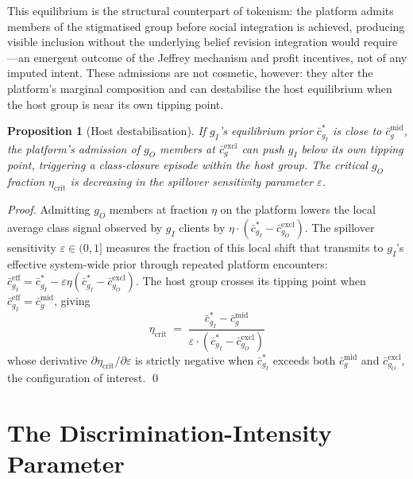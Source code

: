 \documentclass[pdflatex,sn-basic]{sn-jnl}
\theoremstyle{thmstyleone}
\newtheorem{proposition}{Proposition}
\numberwithin{proposition}{subsection}
\begin{document}
This equilibrium is the structural counterpart of tokenism: the
platform admits members of the stigmatised group before social
integration is achieved, producing visible inclusion without the
underlying belief revision integration would require---an emergent
outcome of the Jeffrey mechanism and profit incentives, not of any
imputed intent. These admissions are not cosmetic, however: they
alter the platform's marginal composition and can destabilise the
host equilibrium when the host group is near its own tipping point.

\begin{proposition}[Host destabilisation]
\label{prop:spillover}
If $g_I$'s equilibrium prior $\bar{c}_{g_I}^*$ is close to
$\bar{c}_g^{\mathrm{mid}}$, the platform's admission of $g_O$ members
at $\bar{c}_g^{\mathrm{excl}}$ can push $g_I$ below its own tipping
point, triggering a class-closure episode within the host group. The
critical $g_O$ fraction $\eta_{\mathrm{crit}}$ is decreasing in the
spillover sensitivity parameter $\varepsilon$.
\end{proposition}

\begin{proof}
Admitting $g_O$ members at fraction $\eta$ on the platform lowers
the local average class signal observed by $g_I$ clients by
$\eta \cdot (\bar{c}_{g_I}^* - \bar{c}_{g_O}^{\mathrm{excl}})$. The
spillover sensitivity $\varepsilon \in (0, 1]$ measures the fraction
of this local shift that transmits to $g_I$'s effective system-wide
prior through repeated platform encounters:
$\bar{c}_{g_I}^{\mathrm{eff}} = \bar{c}_{g_I}^*
- \varepsilon \eta (\bar{c}_{g_I}^* - \bar{c}_{g_O}^{\mathrm{excl}})$.
The host group crosses its tipping point when
$\bar{c}_{g_I}^{\mathrm{eff}} = \bar{c}_g^{\mathrm{mid}}$, giving
\[
  \eta_{\mathrm{crit}}
  \;=\; \frac{\bar{c}_{g_I}^* - \bar{c}_g^{\mathrm{mid}}}
  {\varepsilon \cdot (\bar{c}_{g_I}^* - \bar{c}_{g_O}^{\mathrm{excl}})}
\]
whose derivative
$\partial \eta_{\mathrm{crit}} / \partial \varepsilon$ is strictly
negative when $\bar{c}_{g_I}^*$ exceeds both $\bar{c}_g^{\mathrm{mid}}$
and $\bar{c}_{g_O}^{\mathrm{excl}}$, the configuration of interest.
\qed
\end{proof}

\section{The Discrimination-Intensity Parameter}
\label{app:loury}
\end{document}
